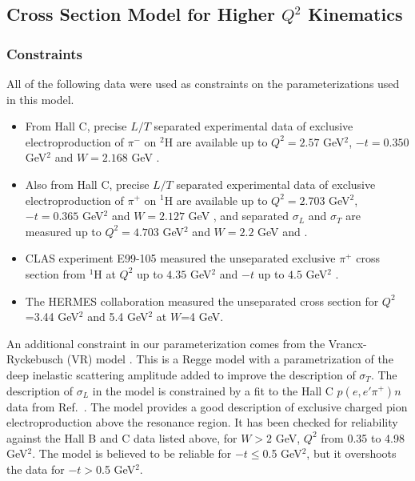\subsection{Cross Section Model for Higher $Q^2$ Kinematics
\label{sec:model}}

\subsubsection{Constraints}

All of the following data were used as constraints on the parameterizations
used in this model.
\begin{itemize}
\item
From Hall C, precise $L/T$ separated experimental data of exclusive
electroproduction of $\pi^{-}$ on $^2$H are available up to $Q^2=2.57$ GeV$^2$,
$-t=0.350$ GeV$^2$ and $W=2.168$ GeV \cite{gmhuber-2}.
\item
Also from Hall C, precise $L/T$ separated experimental data of exclusive
electroproduction of $\pi^{+}$ on $^1$H are available up to $Q^2=2.703$
GeV$^2$, $-t=0.365$ GeV$^2$ and $W=2.127$ GeV \cite{Fpi2}, and separated
$\sigma_{L}$ and $\sigma_{T}$ are measured up to $Q^2=4.703$ GeV$^2$ and
$W=2.2$ GeV \cite{hallc-1} and \cite{hallc-2}.
\item
CLAS experiment E99-105 measured the unseparated exclusive $\pi^+$ cross
section from $^1$H at $Q^2$ up to $4.35$ GeV$^2$ and $-t$ up to $4.5$ GeV$^2$
\cite{park}.
\item
The HERMES collaboration measured the unseparated cross section for $Q^2$=3.44
GeV$^2$ and 5.4 GeV$^2$ \cite{hermes} at $W$=4 GeV.
\end{itemize}

An additional constraint in our parameterization comes from the
Vrancx-Ryckebusch (VR) model \cite{vr}.  This is a Regge model with a
parametrization of the deep inelastic scattering amplitude added to improve the
description of $\sigma_{T}$.  The description of $\sigma_{L}$ in the model is
constrained by a fit to the Hall C $p(e,e'\pi^+)n$ data from
Ref.~\cite{gmhuber}.  The model provides a good description of exclusive
charged pion electroproduction above the resonance region.  It has been checked
for reliability against the Hall B and C data listed above, for $W>2$ GeV,
$Q^2$ from 0.35 to 4.98 GeV$^2$.  The model is believed to be reliable for
$-t\leq$0.5 GeV$^2$, but it overshoots the data for $-t>$0.5 GeV$^2$.

